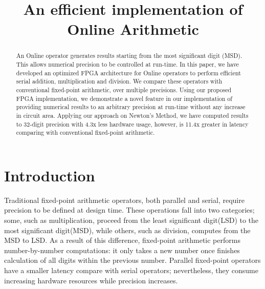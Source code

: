 \documentclass{sig-alternate}
\begin{document}
	\title{An efficient implementation of Online Arithmetic}
	
%	
%	
	\maketitle
	
	\begin{abstract}
		An Online operator generates results starting from the most significant digit (MSD). 
		This allows numerical precision to be controlled at run-time. In this paper, we have developed an optimized FPGA architecture for Online operators to perform efficient serial addition, multiplication and division. 
		We compare these operators with conventional fixed-point arithmetic, over multiple precisions. Using our proposed FPGA implementation, we demonstrate a novel feature in our implementation of providing numerical results to an arbitrary precision at run-time without any increase in circuit area. 
		Applying our approach on Newton's Method, we have computed results to 32-digit precision with 4.3x less hardware usage, however, is 11.4x greater in latency comparing with conventional fixed-point arithmetic. 
	\end{abstract}
	\vspace{-10pt}
	\section{Introduction}
    Traditional fixed-point arithmetic operators, both parallel and serial, require precision to be defined at design time. 
    These operations fall into two categories; some, such as multiplication, proceed from the least significant digit(LSD) to the most significant digit(MSD), while others, such as division, computes from the MSD to LSD. 
    As a result of this difference, fixed-point arithmetic performs number-by-number computations: it only takes a new number once finishes calculation of all digits within the previous number. 
    Parallel fixed-point operators have a smaller latency compare with serial operators; nevertheless, they consume increasing hardware resources while precision increases. 
	
\end{document}
